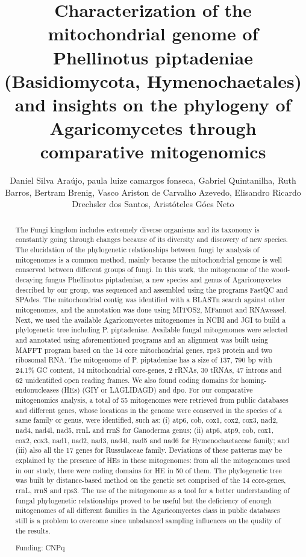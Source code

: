 \documentclass[twoside]{article}
\title{\vspace{-15mm}\fontsize{24pt}{10pt}\selectfont\textbf{ Characterization of the mitochondrial genome of Phellinotus piptadeniae (Basidiomycota,  Hymenochaetales) and insights on the phylogeny of Agaricomycetes through comparative mitogenomics }} %
\author{ Daniel Silva Ara\'ujo, paula  luize camargos fonseca, Gabriel Quintanilha, Ruth Barros, Bertram Brenig, Vasco Ariston de Carvalho Azevedo, Elisandro Ricardo Drechsler dos Santos, Arist\'oteles G\'oes Neto }
\affil{ University G\"ottingen }
\date{}
\begin{document}
  
  
  \maketitle %
  
  
  \thispagestyle{fancy} %
  
  
  \begin{abstract}
  The Fungi kingdom includes extremely diverse organisms and its taxonomy is constantly going through changes because of its diversity and discovery of new species. The elucidation of the phylogenetic relationships between fungi by analysis of mitogenomes is a common method,  mainly because the mitochondrial genome is well conserved between different groups of fungi. In this work,  the mitogenome of the wood-decaying fungus Phellinotus piptadeniae,  a new species and genus of Agaricomycetes described by our group,  was sequenced and assembled using the programs FastQC and SPAdes. The mitochondrial contig was identified with a BLASTn search against other mitogenomes,  and the annotation was done using MITOS2,  MFannot and RNAweasel. Next,  we used the available Agaricomycetes mitogenomes in NCBI and JGI to build a phylogenetic tree including P. piptadeniae. Available fungal mitogenomes were selected and annotated using aforementioned programs and an alignment was built using MAFFT program based on the 14 core mitochondrial genes,  rps3 protein and two ribosomal RNA. The mitogenome of P. piptadeniae has a size of 137, 790 bp with 24.1\% GC content,  14 mitochondrial core-genes,  2 rRNAs,  30 tRNAs,  47 introns and 62 unidentified open reading frames. We also found coding domains for homing-endonucleases (HEs) (GIY or LAGLIDAGD) and dpo. For our comparative mitogenomics analysis,  a total of 55 mitogenomes were retrieved from public databases and different genes,  whose locations in the genome were conserved in the species of a same family or genus,  were identified,  such as: (i) atp6,  cob,  cox1,  cox2,  cox3,  nad2,  nad4,  nad4l,  nad5,  rrnL and rrnS for Ganoderma genus; (ii) atp6,  atp9,  cob,  cox1,  cox2,  cox3,  nad1,  nad2,  nad3,  nad4l,  nad5 and nad6 for Hymenochaetaceae family; and (iii) also all the 17 genes for Russulaceae family. Deviations of these patterns may be explained by the presence of HEs in these mitogenomes: from all the mitogenomes used in our study,  there were coding domains for HE in 50 of them. The phylogenetic tree was built by distance-based method on the genetic set comprised of the 14 core-genes,  rrnL,  rrnS and rps3. The use of the mitogenome as a tool for a better understanding of fungal phylogenetic relationships proved to be useful but the deficiency of enough mitogenomes of all different families in the Agaricomycetes class in public databases still is a problem to overcome since unbalanced sampling influences on the quality of the results.
  
  Funding: CNPq \\ 
  \end{abstract}
  
\end{document}
